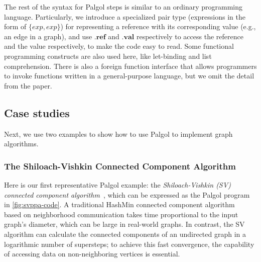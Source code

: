 \documentclass{sokendai_thesis} %
\begin{document}
The rest of the syntax for Palgol steps is similar to an ordinary programming language.
Particularly, we introduce a specialized pair type (expressions in the form of $\{\mathit{exp},\mathit{exp}\}$) for representing a reference with its corresponding value (e.g., an edge in a graph), and use $.\mathbf{ref}$ and $.\mathbf{val}$ respectively to access the reference and the value respectively, to make the code easy to read.
Some functional programming constructs are also used here, like let-binding and list comprehension.
There is also a foreign function interface that allows programmers to invoke functions written in a general-purpose language, but we omit the detail from the paper.

\subsection{Case studies}

Next, we use two examples to show how to use Palgol to implement graph algorithms.

\subsubsection{The Shiloach-Vishkin Connected Component Algorithm}
\label{sec:sv-algorithm}

Here is our first representative Palgol example: the \emph{Shiloach-Vishkin (SV) connected component algorithm}~\cite{yan2015effective}, which can be expressed as the Palgol program in \autoref{fig:svppa-code}.
A traditional HashMin connected component algorithm~\cite{yan2015effective} based on neighborhood communication takes time proportional to the input graph's diameter, which can be large in real-world graphs.
In contrast, the SV algorithm can calculate the connected components of an undirected graph in a logarithmic number of supersteps; to achieve this fast convergence, the capability of accessing data on non-neighboring vertices is essential.
\end{document}
